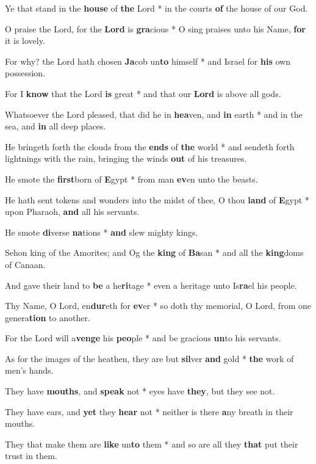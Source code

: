 \begin{multicols}{2}
	Ye that stand in the \textbf{house} of \textbf{the} Lord * in the courts \textbf{of} the house of our God.
	
	O praise the Lord, for the \textbf{Lord} is \textbf{gra}cious * O sing praises unto his Name, \textbf{for} it is lovely.
	
	For why? the Lord hath chosen \textbf{Ja}cob un\textbf{to} himself * and Israel for \textbf{his} own possession.
	
	For I \textbf{know} that the Lord \textbf{is} great * and that our \textbf{Lord} is above all gods.
	
	Whatsoever the Lord pleased, that did he in \textbf{hea}ven, and \textbf{in} earth * and in the sea, and \textbf{in} all deep places.
	
	He bringeth forth the clouds from the \textbf{ends} of \textbf{the} world * and sendeth forth lightnings with the rain, bringing the winds \textbf{out} of his treasures.
	
	He smote the \textbf{first}born of \textbf{E}gypt * from man \textbf{ev}en unto the beasts.
	
	He hath sent tokens and wonders into the midst of thee, O thou \textbf{land} of \textbf{E}gypt * upon Pharaoh, \textbf{and} all his servants.
	
	He smote \textbf{di}verse \textbf{na}tions * \textbf{and} slew mighty kings.
	
	Sehon king of the Amorites; and Og the \textbf{king} of \textbf{Ba}san * and all the \textbf{king}doms of Canaan.
	
	And gave their land to \textbf{be} a he\textbf{ri}tage * even a heritage unto Is\textbf{ra}el his people.
	
	Thy Name, O Lord, en\textbf{dur}eth for \textbf{ev}er * so doth thy memorial, O Lord, from one genera\textbf{tion} to another.
	
	For the Lord will a\textbf{venge} his \textbf{peo}ple * and be gracious \textbf{un}to his servants.
	
	As for the images of the heathen, they are but \textbf{sil}ver \textbf{and} gold * \textbf{the} work of men's hands.
	
	They have \textbf{mouths}, and \textbf{speak} not * eyes have \textbf{they}, but they see not.
	
	They have ears, and \textbf{yet} they \textbf{hear} not * neither is there \textbf{a}ny breath in their mouths.
	
	They that make them are \textbf{like} un\textbf{to} them * and so are all they \textbf{that} put their trust in them.
	

\end{multicols}
